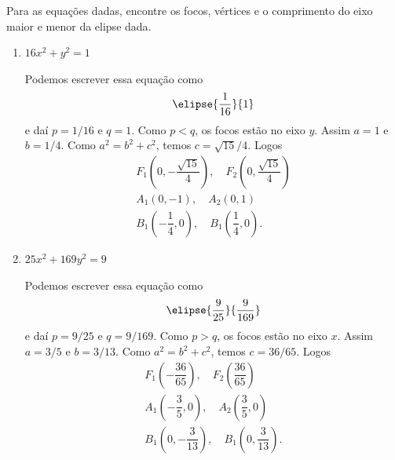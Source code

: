 \begin{exemplos}
  Para as equações dadas, encontre os focos, vértices e o comprimento do eixo maior e menor da elipse dada.
  \begin{enumerate}
    \item $16x^2 + y^2 = 1$
    \begin{solucao}
      Podemos escrever essa equação como
      \[
        \elipse{\dfrac{1}{16}}{1}
      \]
      e daí $p = 1/16$ e $q = 1$. Como $p < q$, os focos estão no eixo $y$. Assim $a = 1$ e $b = 1/4$. Como $a^2 = b^2 + c^2$, temos $c = \sqrt{15}/4$. Logos
      \begin{align*}
        F_1\left(0,-\dfrac{\sqrt{15}}{4}\right),\quad F_2\left(0,\dfrac{\sqrt{15}}{4}\right)\\
        A_1(0,-1),\quad A_2(0,1)\\
        B_1\left(-\dfrac{1}{4},0\right),\quad B_1\left(\dfrac{1}{4},0\right).
      \end{align*}
    \end{solucao}
    \item $25x^2 + 169y^2 = 9$
    \begin{solucao}
      Podemos escrever essa equação como
      \[
        \elipse{\dfrac{9}{25}}{\dfrac{9}{169}}
      \]
      e daí $p = 9/25$ e $q = 9/169$. Como $p > q$, os focos estão no eixo $x$. Assim $a = 3/5$ e $b = 3/13$. Como $a^2 = b^2 + c^2$, temos $c = 36/65$. Logos
      \begin{align*}
        F_1\left(-\dfrac{36}{65}\right),\quad F_2\left(\dfrac{36}{65}\right)\\
        A_1\left(-\dfrac{3}{5},0\right),\quad A_2\left(\dfrac{3}{5},0\right)\\
        B_1\left(0,-\dfrac{3}{13}\right),\quad B_1\left(0,\dfrac{3}{13}\right).
      \end{align*}
    \end{solucao}
  \end{enumerate}
\end{exemplos}

